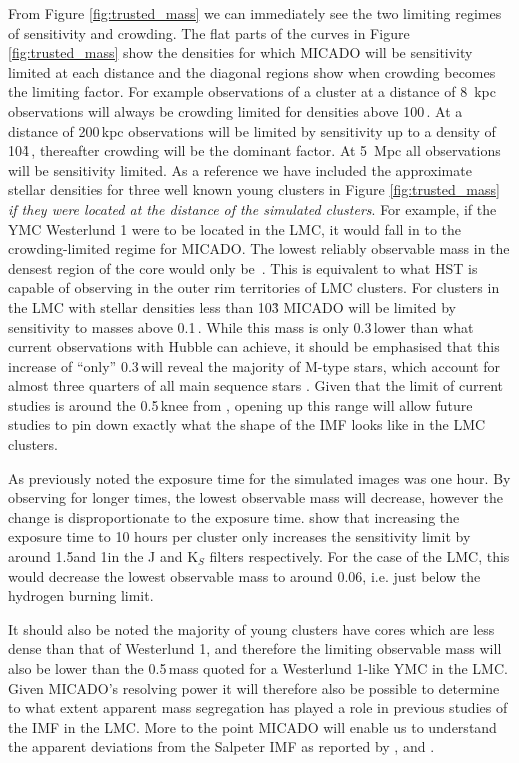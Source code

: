 From Figure \ref{fig:trusted_mass} we can immediately see the two limiting
regimes of sensitivity and crowding. The flat parts of the curves in Figure
\ref{fig:trusted_mass} show the densities for which MICADO will be sensitivity
limited at each distance and the diagonal regions show when crowding becomes
the limiting factor. For example observations of a cluster at a distance of 8\,
kpc observations will always be crowding limited for densities above 100\,\spae.
At a distance of 200\,kpc observations will be limited by sensitivity up to a
density of 10\h4\,\spa, thereafter crowding will be the dominant factor. At
5\, Mpc all observations will be sensitivity limited. As a reference we have
included the approximate stellar densities for three well known young  clusters
in Figure \ref{fig:trusted_mass} \textit{if they were located at the distance
of the simulated clusters}. For example, if the YMC Westerlund 1 were to be
located in the LMC, it would fall in to the crowding-limited regime for MICADO.
The lowest reliably observable mass in the densest region of the core would
only be \,\msun. This is equivalent to what HST is capable of observing
in the outer rim territories of LMC clusters. For clusters in the LMC with
stellar densities less than 10\h3 MICADO will be limited by sensitivity to
masses above 0.1\,\msun. While this mass is only 0.3\,\msun lower than what
current observations with Hubble can achieve, it should be emphasised that
this increase of ``only'' 0.3\,\msun will reveal the majority of M-type stars,
which account for almost three quarters of all main sequence stars
\citep{ledrew2001}. Given that the limit of current studies is around
the 0.5\,\msun knee from \citet{kroupa2001}, opening up this range will allow
future studies to pin down exactly what the shape of the IMF looks like in the
LMC clusters.

As previously noted the exposure time for the simulated images was one hour. By
observing for longer times, the lowest observable mass will decrease, however
the change is disproportionate to the exposure time. \citet{leschinski2016}
show that increasing the exposure time to 10 hours per cluster only increases
the sensitivity limit by around 1.5\m and 1\m in the J and K$_S$ filters
respectively. For the case of the LMC, this would decrease the lowest
observable mass to around 0.06\msune, i.e. just below the hydrogen burning
limit.

It should also be noted the majority of young clusters have cores which are
less dense than that of Westerlund 1, and therefore the limiting observable
mass will also be lower than the 0.5\,\msun mass quoted for a Westerlund 1-like
YMC in the LMC. Given MICADO's resolving power it will therefore also be
possible to determine to what extent apparent mass segregation has played a
role in previous studies of the IMF in the LMC. More to the point MICADO will
enable us to understand the apparent deviations from the Salpeter IMF as
reported by \citet{dario2009}, \citet{geha2013} and \citet{kalirai2013}.

